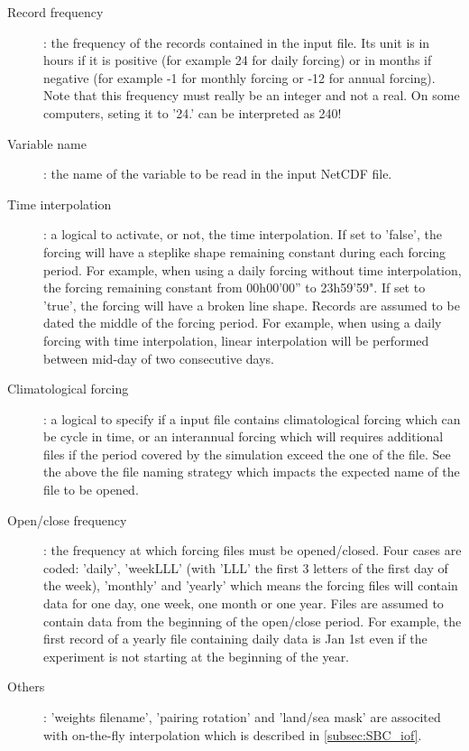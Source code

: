 \documentclass[../tex_main/NEMO_manual]{subfiles}
\begin{document}
\begin{description}
\item[Record frequency]: the frequency of the records contained in the input file. 
Its unit is in hours if it is positive (for example 24 for daily forcing) or in months if negative 
(for example -1 for monthly forcing or -12 for annual forcing). 
Note that this frequency must really be an integer and not a real. 
On some computers, seting it to '24.' can be interpreted as 240!

\item[Variable name]: the name of the variable to be read in the input NetCDF file.

\item[Time interpolation]: a logical to activate, or not, the time interpolation. If set to 'false', 
the forcing will have a steplike shape remaining constant during each forcing period. 
For example, when using a daily forcing without time interpolation, the forcing remaining 
constant from 00h00'00'' to 23h59'59". If set to 'true', the forcing will have a broken line shape. 
Records are assumed to be dated the middle of the forcing period. 
For example, when using a daily forcing with time interpolation, linear interpolation will 
be performed between mid-day of two consecutive days. 

\item[Climatological forcing]: a logical to specify if a input file contains climatological forcing 
which can be cycle in time, or an interannual forcing which will requires additional files 
if the period covered by the simulation exceed the one of the file. See the above the file 
naming strategy which impacts the expected name of the file to be opened. 

\item[Open/close frequency]: the frequency at which forcing files must be opened/closed. 
Four cases are coded: 'daily', 'weekLLL' (with 'LLL' the first 3 letters of the first day of the week), 
'monthly' and 'yearly' which means the forcing files will contain data for one day, one week, 
one month or one year. Files are assumed to contain data from the beginning of the open/close period. 
For example, the first record of a yearly file containing daily data is Jan 1st even if the experiment 
is not starting at the beginning of the year. 

\item[Others]: 'weights filename', 'pairing rotation' and 'land/sea mask' are associted with on-the-fly interpolation 
which is described in \autoref{subsec:SBC_iof}.

\end{description}
\end{document}
